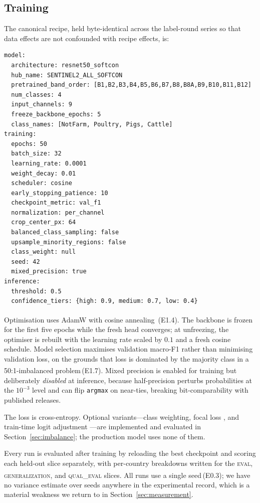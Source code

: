 \documentclass[11pt,a4paper]{article}
\newcommand{\code}[1]{\texttt{\small #1}}
\newcommand{\unablated}[1]{\textsuperscript{\dag}\,(#1)}
\begin{document}
\subsection{Training}
\label{sec:training}

The canonical recipe, held byte-identical across the label-round series so that
data effects are not confounded with recipe effects, is:

\begin{lstlisting}[caption={Canonical training configuration (production model).},captionpos=b]
model:
  architecture: resnet50_softcon
  hub_name: SENTINEL2_ALL_SOFTCON
  pretrained_band_order: [B1,B2,B3,B4,B5,B6,B7,B8,B8A,B9,B10,B11,B12]
  num_classes: 4
  input_channels: 9
  freeze_backbone_epochs: 5
  class_names: [NotFarm, Poultry, Pigs, Cattle]
training:
  epochs: 50
  batch_size: 32
  learning_rate: 0.0001
  weight_decay: 0.01
  scheduler: cosine
  early_stopping_patience: 10
  checkpoint_metric: val_f1
  normalization: per_channel
  crop_center_px: 64
  balanced_class_sampling: false
  upsample_minority_regions: false
  class_weight: null
  seed: 42
  mixed_precision: true
inference:
  threshold: 0.5
  confidence_tiers: {high: 0.9, medium: 0.7, low: 0.4}
\end{lstlisting}

Optimisation uses AdamW \citep{loshchilov2019adamw} with cosine annealing
\citep{loshchilov2017sgdr}\unablated{E1.4}. The backbone is frozen for the first
five epochs while the fresh head converges; at unfreezing, the optimiser is
rebuilt with the learning rate scaled by $0.1$ and a fresh cosine schedule.
Model selection maximises validation macro-F1 rather than minimising validation
loss, on the grounds that loss is dominated by the majority class in a
50:1-imbalanced problem\unablated{E1.7}. Mixed precision is enabled for training
but deliberately \emph{disabled} at inference, because half-precision perturbs
probabilities at the $10^{-3}$ level and can flip \code{argmax} on near-ties,
breaking bit-comparability with published releases.

The loss is cross-entropy. Optional variants---class weighting, focal loss
\citep{lin2017focal}, and train-time logit adjustment
\citep{menon2021logit}---are implemented and evaluated in
Section~\ref{sec:imbalance}; the production model uses none of them.

Every run is evaluated after training by reloading the best checkpoint and
scoring each held-out slice separately, with per-country breakdowns written for
the \textsc{eval}, \textsc{generalization}, and \textsc{qual\_eval} slices. All
runs use a single seed\unablated{E0.3}; we have no variance estimate over seeds
anywhere in the experimental record, which is a material weakness we return to
in Section~\ref{sec:measurement}.
\end{document}
